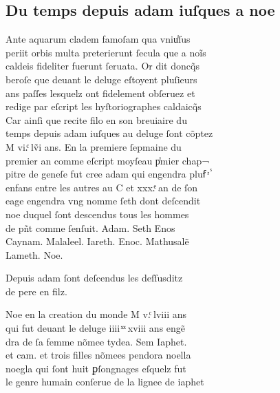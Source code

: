 \documentclass[12pt]{article}
\begin{document}
\newpage






\subsection*{Du temps depuis adam iuſques a noe}


Ante aquarum cladem famoſam qua vniu̾ſus\\
periit orbis
              multa preterierunt ſecula que a noĩs\\
caldeis fideliter fuerunt
              ſeruata. Or dit doncq̃s\\
beroſe que deuant le
          deluge eſtoyent pluſieurs\\
ans paſſes lesquelz ont fidelement obſeruez et\\
redige par eſcript les hyſtoriographes caldaicq̃s\\
Car ainſi que recite
            filo en son breuiaire du\\
temps depuis adam iuſques au deluge ſont cõptez\\
M vi.ͨ lṽi ans. En
          la premiere ſepmaine du\\
premier an comme eſcript moyſeau p̾mier chap¬\\
pitre de geneſe
          fut cree adam qui engendra pluẜ ͬ ᷤ\\
enfans entre les autres au C et xxx.ͤ an de
            ſon\\
eage engendra vng nomme ſeth dont
            deſcendit\\
noe duquel ſont descendus tous les
            hommes\\
de pñt comme ſenſuit. Adam.
            Seth Enos\\
Caynam. Malaleel. Iareth. Enoc. Mathusalẽ\\
Lameth. Noe.



Depuis adam ſont deſcendus les deſſusditz\\
de pere en filz.



Noe en la creation du monde M v.ͨ lviii ans\\
qui fut deuant le deluge iiii ͯ ͯ xviii ans engẽ\\
dra de ſa femme
          nõmee tydea. Sem Iaphet.\\
et cam. et trois filles nõmees
            pendora noella\\
noegla qui ſont huit ꝑſongnages eſquelz fut\\
le
          genre humain conſerue de la lignee de iaphet
\end{document}
